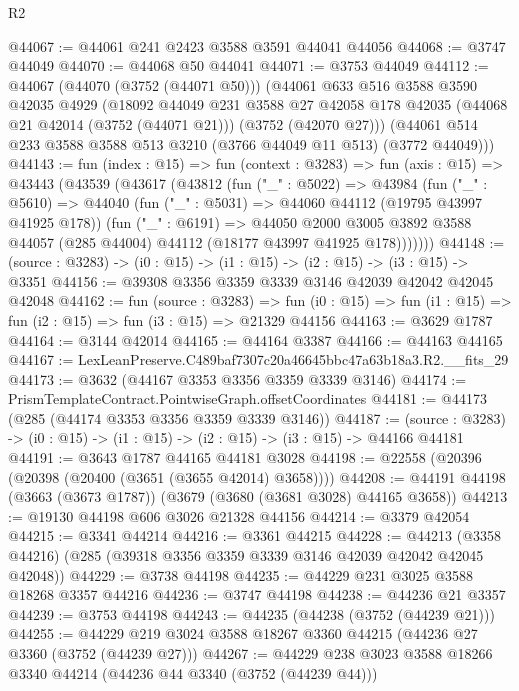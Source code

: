 \begin{lexlean}{R2}
\begin{coremodule}
@44067 := @44061 @241 @2423 @3588 @3591 @44041 @44056
@44068 := @3747 @44049
@44070 := @44068 @50 @44041
@44071 := @3753 @44049
@44112 := @44067
    (@44070 (@3752 (@44071 @50)))
    (@44061
      @633
      @516
      @3588
      @3590
      @42035
      @4929
      (@18092
        @44049
        @231
        @3588
        @27
        @42058
        @178
        @42035
        (@44068 @21 @42014 (@3752 (@44071 @21)))
        (@3752 (@42070 @27)))
      (@44061 @514 @233 @3588 @3588 @513 @3210 (@3766 @44049 @11 @513) (@3772 @44049)))
@44143 := fun (index : @15) =>
  fun (context : @3283) =>
  fun (axis : @15) =>
  @43443
    (@43539
      (@43617
        (@43812
          (fun ("_" : @5022) =>
          @43984
            (fun ("_" : @5610) =>
            @44040
              (fun ("_" : @5031) => @44060 @44112 (@19795 @43997 @41925 @178))
              (fun ("_" : @6191) =>
              @44050
                @2000
                @3005
                @3892
                @3588
                @44057
                (@285 @44004)
                @44112
                (@18177 @43997 @41925 @178)))))))
@44148 := (source : @3283) -> (i0 : @15) -> (i1 : @15) -> (i2 : @15) -> (i3 : @15) -> @3351
@44156 := @39308 @3356 @3359 @3339 @3146 @42039 @42042 @42045 @42048
@44162 := fun (source : @3283) =>
  fun (i0 : @15) => fun (i1 : @15) => fun (i2 : @15) => fun (i3 : @15) => @21329 @44156
@44163 := @3629 @1787
@44164 := @3144 @42014
@44165 := @44164 @3387
@44166 := @44163 @44165
@44167 := LexLeanPreserve.C489baf7307c20a46645bbc47a63b18a3.R2.__fits_29
@44173 := @3632 (@44167 @3353 @3356 @3359 @3339 @3146)
@44174 := PrismTemplateContract.PointwiseGraph.offsetCoordinates
@44181 := @44173 (@285 (@44174 @3353 @3356 @3359 @3339 @3146))
@44187 := (source : @3283) -> (i0 : @15) -> (i1 : @15) -> (i2 : @15) -> (i3 : @15) -> @44166 @44181
@44191 := @3643 @1787 @44165 @44181 @3028
@44198 := @22558 (@20396 (@20398 (@20400 (@3651 (@3655 @42014) @3658))))
@44208 := @44191 @44198 (@3663 (@3673 @1787)) (@3679 (@3680 (@3681 @3028) @44165 @3658))
@44213 := @19130 @44198 @606 @3026 @21328 @44156
@44214 := @3379 @42054
@44215 := @3341 @44214
@44216 := @3361 @44215
@44228 := @44213 (@3358 @44216) (@285 (@39318 @3356 @3359 @3339 @3146 @42039 @42042 @42045 @42048))
@44229 := @3738 @44198
@44235 := @44229 @231 @3025 @3588 @18268 @3357 @44216
@44236 := @3747 @44198
@44238 := @44236 @21 @3357
@44239 := @3753 @44198
@44243 := @44235 (@44238 (@3752 (@44239 @21)))
@44255 := @44229 @219 @3024 @3588 @18267 @3360 @44215 (@44236 @27 @3360 (@3752 (@44239 @27)))
@44267 := @44229 @238 @3023 @3588 @18266 @3340 @44214 (@44236 @44 @3340 (@3752 (@44239 @44)))

\end{coremodule}
\end{lexlean}
